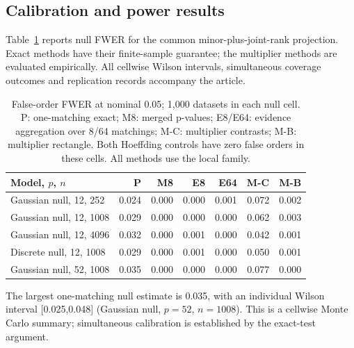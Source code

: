 \subsection{Calibration and power results}
Table~\ref{tab:nullnew} reports null FWER for the common minor-plus-joint-rank projection. Exact methods have their finite-sample guarantee; the multiplier methods are evaluated empirically. All cellwise Wilson intervals, simultaneous coverage outcomes and replication records accompany the article.
\begin{table}[htbp]\centering\small
\setlength{\tabcolsep}{4pt}
\caption{False-order FWER at nominal 0.05; 1,000 datasets in each null cell. P: one-matching exact; M8: merged p-values; E8/E64: evidence aggregation over 8/64 matchings; M-C: multiplier contrasts; M-B: multiplier rectangle. Both Hoeffding controls have zero false orders in these cells. All methods use the local family.}\label{tab:nullnew}
\begin{lrbox}{\resultsbox}\begin{tabular}{lrrrrrr}
\toprule
Model, $p$, $n$ & P & M8 & E8 & E64 & M-C & M-B\\
\midrule
Gaussian null, 12, 252 & 0.024 & 0.000 & 0.000 & 0.001 & 0.072 & 0.002\\
Gaussian null, 12, 1008 & 0.029 & 0.000 & 0.000 & 0.000 & 0.062 & 0.003\\
Gaussian null, 12, 4096 & 0.032 & 0.000 & 0.001 & 0.000 & 0.042 & 0.001\\
Discrete null, 12, 1008 & 0.029 & 0.000 & 0.001 & 0.000 & 0.050 & 0.001\\
Gaussian null, 52, 1008 & 0.035 & 0.000 & 0.000 & 0.000 & 0.077 & 0.000\\
\bottomrule\end{tabular}\end{lrbox}\ifdim\wd\resultsbox>\linewidth\resizebox{\linewidth}{!}{\usebox{\resultsbox}}\else\usebox{\resultsbox}\fi\end{table}
The largest one-matching null estimate is 0.035, with an individual Wilson interval [0.025,0.048] (Gaussian null, $p=52$, $n=1008$). This is a cellwise Monte Carlo summary; simultaneous calibration is established by the exact-test argument.
